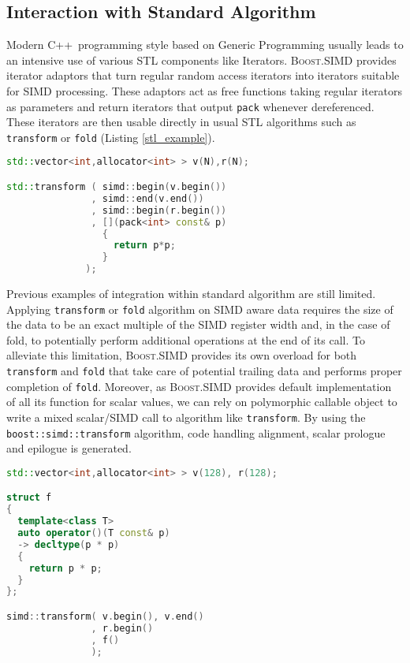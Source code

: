 \documentclass[preprint]{sigplanconf}
\providecommand{\boostsimd}{\textsc{Boost.SIMD}}
\providecommand{\cpp}[1][~]{\textsc{C++}#1}
\begin{document}
\subsection{Interaction with Standard Algorithm}
Modern \cpp programming style based on Generic Programming usually leads to an
intensive use of various STL components like Iterators. \boostsimd{} provides
iterator adaptors that turn regular random access iterators into iterators
suitable for SIMD processing. These adaptors act as free functions taking
regular iterators as parameters and return iterators that output \texttt{pack}
whenever dereferenced. These iterators are then usable directly in usual STL
algorithms such as \texttt{transform} or \texttt{fold} (Listing \ref{stl_example}).

\begin{lstlisting}[language=c++, label={lst:square-cxx}, caption={SIMD Iterator with STL algorithm},label=stl_example]
std::vector<int,allocator<int> > v(N),r(N);

std::transform ( simd::begin(v.begin())
               , simd::end(v.end())
               , simd::begin(r.begin())
               , [](pack<int> const& p)
                 { 
                   return p*p; 
                 } 
              );
\end{lstlisting}

Previous examples of integration within standard algorithm are still limited.
Applying \texttt{transform} or \texttt{fold} algorithm on SIMD aware data
requires the size of the data to be an exact multiple of the SIMD register width
and, in the case of fold, to potentially perform additional operations at the
end of its call. To alleviate this limitation, \boostsimd{}
provides its own overload for both \texttt{transform} and \texttt{fold} that take
care of potential trailing data and performs proper completion of \texttt{fold}.
Moreover, as \boostsimd{} provides default implementation of all its function for scalar values,
we can rely on polymorphic callable object to write a mixed scalar/SIMD call to algorithm
like \texttt{transform}. By using the \texttt{boost::simd::transform} algorithm, code
handling alignment, scalar prologue and epilogue is generated.

\begin{lstlisting}[language=c++, label={lst:square-cxx}, caption={Polymorphic SIMD algorithm call},label=stl_poly]
std::vector<int,allocator<int> > v(128), r(128);

struct f
{
  template<class T>
  auto operator()(T const& p)
  -> decltype(p * p)
  {
    return p * p;
  }
};

simd::transform( v.begin(), v.end()
               , r.begin()
               , f() 
               );
\end{lstlisting}
\end{document}
